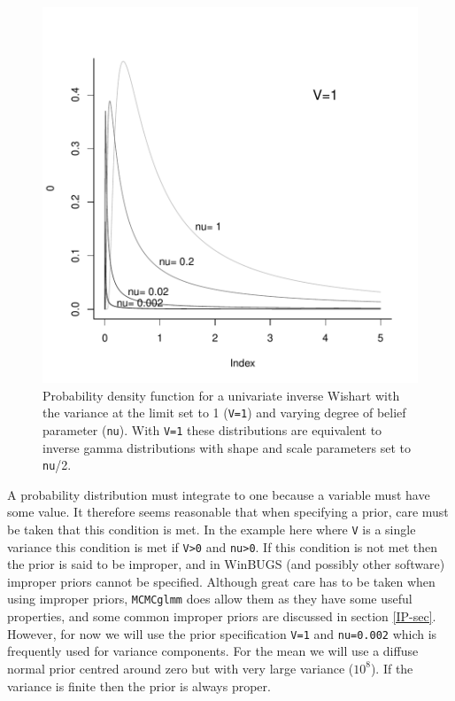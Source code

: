 \documentclass{article}
\begin{document}
\begin{figure}[!h]
\begin{center}
\includegraphics{Lecture1-027}
\end{center}
\caption{Probability density function for a univariate inverse Wishart with the variance at the limit set to 1 (\texttt{V=1}) and varying degree of belief parameter (\texttt{nu}). With \texttt{V=1} these distributions are equivalent to inverse gamma distributions with shape and scale parameters set to \texttt{nu}/2.}
\label{dinvgamma-fig}
\end{figure}

A probability distribution must integrate to one because a variable must have some value. It therefore seems reasonable that when specifying a prior, care must be taken that this condition is met. In the example here where \texttt{V} is a single variance this condition is met if \texttt{V>0} and \texttt{nu>0}.  If this condition is not met then the prior is said to be improper, and in WinBUGS (and possibly other software) improper priors cannot be specified.  Although great care has to be taken when using improper priors, \texttt{MCMCglmm} does allow them as they have some useful properties, and some common improper priors are discussed in section \ref{IP-sec}. However, for now we will use the prior specification \texttt{V=1} and \texttt{nu=0.002} which is frequently used for variance components. For the mean we will use a diffuse normal prior centred around zero but with very large variance ($10^{8}$). If the variance is finite then the prior is always proper.\\
\end{document}
